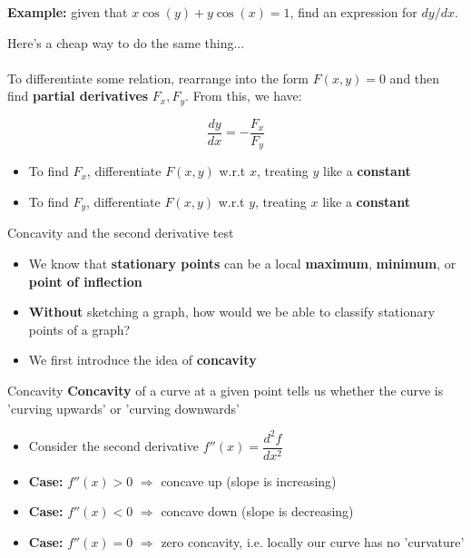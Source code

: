 \documentclass{beamer}
\begin{document}
\begin{frame}
	\textbf{Example:} given that $x \cos(y) + y \cos(x) = 1$, find an expression for $dy/dx$.
	\vspace{5cm}
\end{frame}

\begin{frame}
	Here's a cheap way to do the same thing...\\~\\
	To differentiate some relation, rearrange into the form $F(x, y) = 0$ and then find \textbf{partial derivatives} $F_x, F_y$. From this, we have:
	
	$$\dfrac{dy}{dx} = -\dfrac{F_x}{F_y}$$

	\begin{itemize}
		\item To find $F_x$, differentiate $F(x, y)$ w.r.t $x$, treating $y$ like a \textbf{constant}
		\item To find $F_y$, differentiate $F(x, y)$ w.r.t $y$, treating $x$ like a \textbf{constant}
	\end{itemize}
\end{frame}

\begin{frame}{Concavity and the second derivative test}
	\begin{itemize}
		\item We know that \textbf{stationary points} can be a local \textbf{maximum}, \textbf{minimum}, or \textbf{point of inflection}
		\item \textbf{Without} sketching a graph, how would we be able to classify stationary points of a graph?
		\item We first introduce the idea of \textbf{concavity}
	\end{itemize}
\end{frame}

\begin{frame}{Concavity}
	\textbf{Concavity} of a curve at a given point tells us whether the curve is 'curving upwards' or 'curving downwards'
	\begin{itemize}
		\item Consider the second derivative $f''(x) = \dfrac{d^2f}{dx^2}$
		\item \textbf{Case: } $f''(x) > 0$ $\Rightarrow$ concave up (slope is increasing)
		\item \textbf{Case: } $f''(x) < 0$ $\Rightarrow$ concave down (slope is decreasing)
		\item \textbf{Case: } $f''(x) = 0$ $\Rightarrow$ zero concavity, i.e. locally our curve has no 'curvature'
	\end{itemize}
\end{frame}
\end{document}
